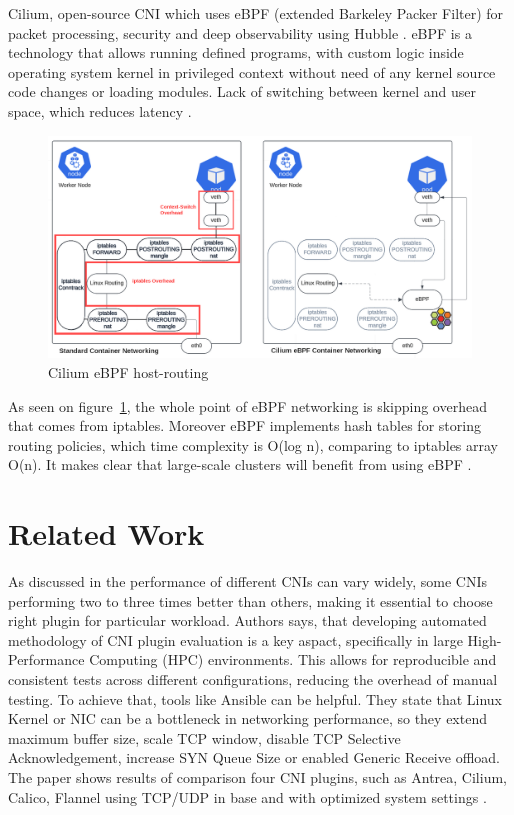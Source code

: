 Cilium, open-source CNI which uses eBPF (extended Barkeley Packer Filter) for packet processing, security and deep observability using Hubble \cite{CiliumOverview}. eBPF is a technology that allows running defined programs, with custom logic inside operating system kernel in privileged context without need of any kernel source code changes or loading modules. Lack of switching between kernel and user space, which reduces latency \cite{eBPF}.

\begin{figure}[tbh]
    \centering
    \includegraphics[width=1\columnwidth]{images/ebpf_hostrouting.png}
    \caption{Cilium eBPF host-routing \cite{CiliumCNIBenchmark}}
    \label{fig:ebpf_routing}
\end{figure}


As seen on figure~\ref{fig:ebpf_routing}, the whole point of eBPF networking is skipping overhead that comes from iptables. Moreover eBPF implements hash tables for storing routing policies, which time complexity is O(log n), comparing to iptables array O(n). It makes clear that large-scale clusters will benefit from using eBPF \cite{IsovalentHash}. 

\section{Related Work}
\label{sec:realted_work}

As discussed in \cite{dakic2024performance} the performance of different CNIs can vary widely, some CNIs performing two to three times better than others, making it essential to choose right plugin for particular workload. Authors says, that developing automated methodology of CNI plugin evaluation is a key aspact, specifically in large High-Performance Computing (HPC) environments. This allows for reproducible and consistent tests across different configurations, reducing the overhead of manual testing. To achieve that, tools like Ansible can be helpful. They state that Linux Kernel or NIC can be a bottleneck in networking performance, so they extend maximum buffer size, scale TCP window, disable TCP Selective Acknowledgement, increase SYN Queue Size or enabled Generic Receive offload. The paper shows results of comparison four CNI plugins, such as Antrea, Cilium, Calico, Flannel using TCP/UDP in base and with optimized system settings \cite{dakic2024performance}.

